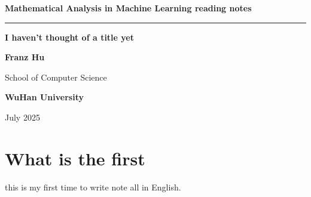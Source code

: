 \documentclass[a4paper,10pt]{article}
\begin{document}
\pagestyle{empty}
\begin{titlepage}
    \centering
    \selectfont %
    {\Large\bfseries Mathematical Analysis in Machine Learning reading notes\par}
    \vspace{1cm}
    \rule{\textwidth}{0.4pt}\par %
    \vspace{1.5cm}
    {\Huge\bfseries I haven't thought of a title yet\par}
    \vfill
    {\large\bfseries Franz Hu\par}
    \vspace{1cm}
    {\large School of Computer Science\par}
    {\large\bfseries WuHan University\par}
    \vspace{0.5cm}
    {\large July 2025\par}
\end{titlepage}

\section*{What is the first}
this is my first time to write note all in English.


\newpage
\tableofcontents
\newpage

\pagestyle{fancy}

\setcounter{page}{1}

\end{document}
